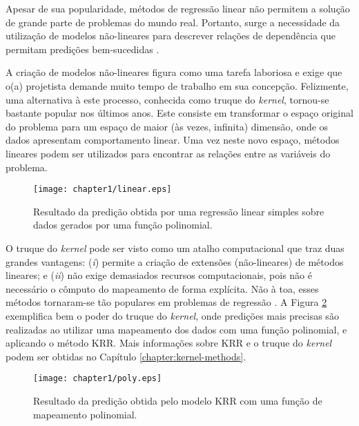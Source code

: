 Apesar de sua popularidade, métodos de regressão linear não permitem a solução de grande parte de problemas do mundo real. Portanto, surge a necessidade da utilização de modelos não-lineares para descrever relações de dependência que permitam predições bem-sucedidas \cite{hofmann2008}.

A criação de modelos não-lineares figura como uma tarefa laboriosa e exige que o(a) projetista demande muito tempo de trabalho em sua concepção. Felizmente, uma alternativa à este processo, conhecida como truque do \textit{kernel}, tornou-se bastante popular nos últimos anos. Este consiste em transformar o espaço original do problema para um espaço de maior (às vezes, infinita) dimensão, onde os dados apresentam comportamento linear. Uma vez neste novo espaço, métodos lineares podem ser utilizados para encontrar as relações entre as variáveis do problema.

\begin{figure}[ht]
    \centering
    \caption{Resultado da predição obtida por uma regressão linear simples sobre dados gerados por uma função polinomial.}
    \label{fig:ch1-linear}
    \texttt{[image: chapter1/linear.eps]}
    \begin{center}
    \end{center}
\end{figure}

O truque do \textit{kernel} pode ser visto como um atalho computacional que traz duas grandes vantagens: (\textit{i}) permite a criação de extensões (não-lineares) de métodos lineares; e (\textit{ii}) não exige demasiados recursos computacionais, pois não é necessário o cômputo do mapeamento de forma explícita. Não à toa, esses métodos tornaram-se tão populares em problemas de regressão \cite{shawe2004}. A Figura \ref{fig:ch1-poly} exemplifica bem o poder do truque do \textit{kernel}, onde predições mais precisas são realizadas ao utilizar uma mapeamento dos dados com uma função polinomial, e aplicando o método KRR. Mais informações sobre KRR e o truque do \textit{kernel} podem ser obtidas no Capítulo \ref{chapter:kernel-methods}.

\begin{figure}[H]
    \centering
    \caption{Resultado da predição obtida pelo modelo KRR com uma função de mapeamento polinomial.}
    \label{fig:ch1-poly}
    \texttt{[image: chapter1/poly.eps]}
    \begin{center}
    \end{center}
\end{figure}

